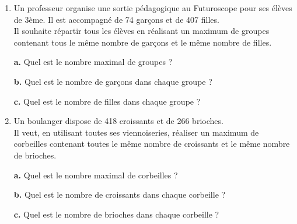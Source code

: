 {\begin{Exercice}
\begin{enumerate}[itemsep=1em]
\begin{minipage}[t]{\linewidth}
\medskip
\textbf {a.} Quel est le nombre maximal de bouquets ?

\medskip
\textbf {b.} Quel est le nombre d'iris dans chaque bouquet ?

\medskip
\textbf {c.} Quel est le nombre de roses dans chaque bouquet ?

\medskip
\end{minipage}
	\item \begin{minipage}[t]{\linewidth}Un professeur organise une sortie pédagogique au Futuroscope pour ses élèves de 3ème. Il est accompagné de 74 garçons et de 407 filles. \\Il souhaite répartir tous les élèves en réalisant un maximum de groupes contenant tous le même nombre de garçons et le même nombre de filles. 

\medskip
\textbf {a.} Quel est le nombre maximal de groupes ?

\medskip
\textbf {b.} Quel est le nombre de garçons dans chaque groupe ?

\medskip
\textbf {c.} Quel est le nombre de filles dans chaque groupe ?

\medskip
\end{minipage}
	\item \begin{minipage}[t]{\linewidth}Un boulanger dispose de 418 croissants et de 266 brioches. \\Il veut, en utilisant toutes ses viennoiseries, réaliser un maximum de corbeilles contenant toutes le même nombre de croissants et le même nombre de brioches. 

\medskip
\textbf {a.} Quel est le nombre maximal de corbeilles ?

\medskip
\textbf {b.} Quel est le nombre de croissants dans chaque corbeille ?

\medskip
\textbf {c.} Quel est le nombre de brioches dans chaque corbeille ?

\medskip
\end{minipage}
\end{enumerate}
\end{Exercice}





}

